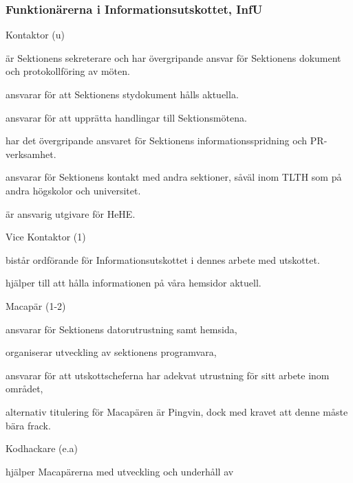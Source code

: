 \documentclass[10pt]{article}
\begin{document}
\subsubsection{Funktionärerna i Informationsutskottet, InfU}
\begin{emptylist}
    \item Kontaktor (u)
        \begin{dashlist}
            \item är Sektionens sekreterare och har övergripande ansvar för Sektionens dokument och protokollföring av möten.
            \item ansvarar för att Sektionens stydokument hålls aktuella.
            \item ansvarar för att upprätta handlingar till Sektionsmötena.
            \item har det övergripande ansvaret för Sektionens informationsspridning och PR-verksamhet.
            \item ansvarar för Sektionens kontakt med andra sektioner, såväl inom TLTH som på andra högskolor och universitet.
            \item är ansvarig utgivare för HeHE.
        \end{dashlist}
    \item Vice Kontaktor (1)
        \begin{dashlist}
            \item bistår ordförande för Informationsutskottet i dennes arbete med utskottet.
            \item hjälper till att hålla informationen på våra hemsidor aktuell.
        \end{dashlist}
    \item Macapär (1-2)
        \begin{dashlist}
            \item ansvarar för Sektionens datorutrustning samt hemsida,
            \item organiserar utveckling av sektionens programvara,
            \item ansvarar för att utskottscheferna har adekvat utrustning
                för sitt arbete inom området,
            \item alternativ titulering för Macapären är Pingvin, dock
                med kravet att denne måste bära frack.
        \end{dashlist}
	\item Kodhackare (e.a)
        \begin{dashlist}
            \item hjälper Macapärerna med utveckling och underhåll av

\end{dashlist}
\end{emptylist}
\end{document}
